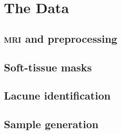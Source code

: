 %
%

\chapter{The Data}\label{model}

\section{\textsc{mri} and preprocessing}\label{data-mri}

\section{Soft-tissue masks}\label{data-soft}

\section{Lacune identification}\label{data-lacune}

\section{Sample generation}\label{data-samples}

%
%
%
%

%
%
%
%
%
%
%
%
%




%